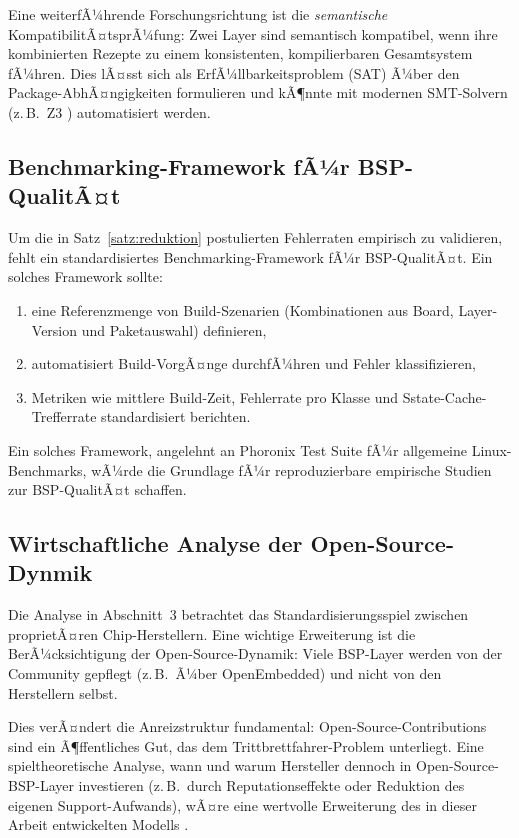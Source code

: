 ﻿\documentclass[a4paper,12pt]{article}
\theoremstyle{definition}
\begin{document}
Eine weiterfÃ¼hrende Forschungsrichtung ist die \emph{semantische} KompatibilitÃ¤tsprÃ¼fung:
Zwei Layer sind semantisch kompatibel, wenn ihre kombinierten Rezepte zu einem
konsistenten, kompilierbaren Gesamtsystem fÃ¼hren. Dies lÃ¤sst sich als
ErfÃ¼llbarkeitsproblem (SAT) Ã¼ber den Package-AbhÃ¤ngigkeiten formulieren \cite{tucker2007}
und kÃ¶nnte mit modernen SMT-Solvern (z.\,B.\ Z3 \cite{demoura2008}) automatisiert werden.

\subsection{Benchmarking-Framework fÃ¼r BSP-QualitÃ¤t}

Um die in Satz~\ref{satz:reduktion} postulierten Fehlerraten empirisch zu validieren,
fehlt ein standardisiertes Benchmarking-Framework fÃ¼r BSP-QualitÃ¤t.
Ein solches Framework sollte:
\begin{enumerate}
	\item eine Referenzmenge von Build-Szenarien (Kombinationen aus Board, Layer-Version
	      und Paketauswahl) definieren,
	\item automatisiert Build-VorgÃ¤nge durchfÃ¼hren und Fehler klassifizieren,
	\item Metriken wie mittlere Build-Zeit, Fehlerrate pro Klasse und
	      Sstate-Cache-Trefferrate standardisiert berichten.
\end{enumerate}

Ein solches Framework, angelehnt an Phoronix Test Suite \cite{phoronix2024}
fÃ¼r allgemeine Linux-Benchmarks, wÃ¼rde die Grundlage fÃ¼r reproduzierbare
empirische Studien zur BSP-QualitÃ¤t schaffen.

\subsection{Wirtschaftliche Analyse der Open-Source-Dynmik}

Die Analyse in Abschnitt~3 betrachtet das Standardisierungsspiel zwischen
proprietÃ¤ren Chip-Herstellern. Eine wichtige Erweiterung ist die
BerÃ¼cksichtigung der Open-Source-Dynamik: Viele BSP-Layer werden von der
Community gepflegt (z.\,B.\ Ã¼ber OpenEmbedded) und nicht von den Herstellern selbst.

Dies verÃ¤ndert die Anreizstruktur fundamental: Open-Source-Contributions
sind ein Ã¶ffentliches Gut, das dem Trittbrettfahrer-Problem unterliegt.
Eine spieltheoretische Analyse, wann und warum Hersteller dennoch in
Open-Source-BSP-Layer investieren (z.\,B.\ durch Reputationseffekte oder
Reduktion des eigenen Support-Aufwands), wÃ¤re eine wertvolle Erweiterung
des in dieser Arbeit entwickelten Modells \cite{lerner2002}.
\end{document}
